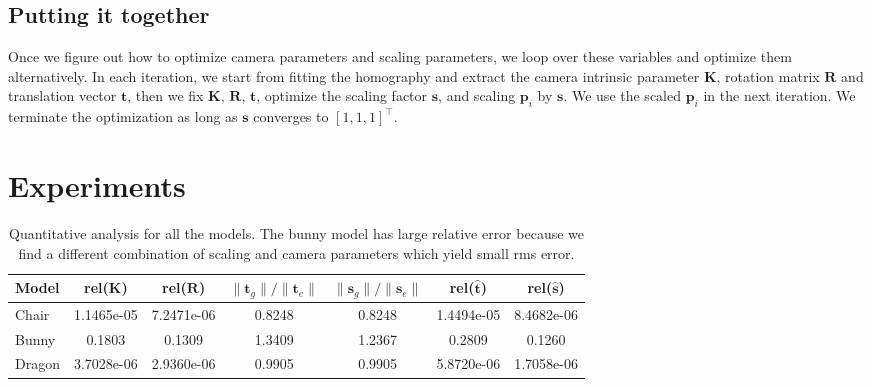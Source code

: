 \documentclass[10pt,twocolumn,letterpaper]{article}
\begin{document}
\subsection{Putting it together}

\noindent
Once we figure out how to optimize camera parameters and scaling parameters, we loop over these variables and optimize them alternatively. In each iteration, we start from fitting the homography and extract the camera intrinsic parameter $\mathbf{K}$, rotation matrix $\mathbf{R}$ and translation vector $\mathbf{t}$, then we fix $\mathbf{K}$, $\mathbf{R}$, $\mathbf{t}$, optimize the scaling factor $\mathbf{s}$, and scaling $\mathbf{p}_i$ by $\mathbf{s}$. We use the scaled $\mathbf{p}_i$ in the next iteration. We terminate the optimization as long as $\mathbf{s}$ converges to $[1,1,1]^\top$.

\section{Experiments}

\begin{table}
\begin{center}
\begin{tabular}{|l|c|c|c|c|c|c|}
\hline
Model & rel($\mathbf{K}$) & rel($\mathbf{R}$) & $\|\mathbf{t}_g\|/\|\mathbf{t}_e\|$ & $\|\mathbf{s}_g\|/\|\mathbf{s}_e\|$ & rel($\hat{\mathbf{t}}$) & rel($\hat{\mathbf{s}}$) \\
\hline\hline
Chair & 1.1465e-05 & 7.2471e-06 & 0.8248 & 0.8248 & 1.4494e-05 & 8.4682e-06 \\
Bunny & 0.1803 & 0.1309 & 1.3409 & 1.2367 & 0.2809 & 0.1260 \\
Dragon & 3.7028e-06 & 2.9360e-06 & 0.9905 & 0.9905 & 5.8720e-06 & 1.7058e-06 \\
\hline
\end{tabular}
\end{center}
\caption{Quantitative analysis for all the models. The bunny model has large relative error because we find a different combination of scaling and camera parameters which yield small rms error.}
\label{tb:err}
\end{table}
\end{document}
